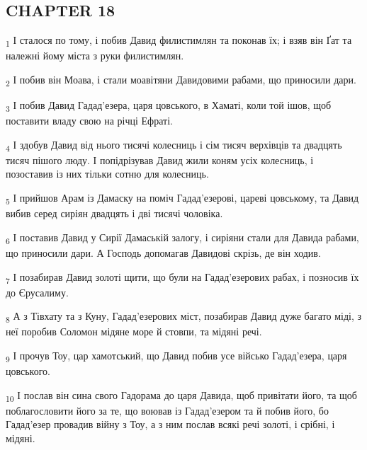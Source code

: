 \subsection{CHAPTER 18}
\begin{tcolorbox}
\textsubscript{1} І сталося по тому, і побив Давид филистимлян та поконав їх; і взяв він Ґат та належні йому міста з руки филистимлян.
\end{tcolorbox}
\begin{tcolorbox}
\textsubscript{2} І побив він Моава, і стали моавітяни Давидовими рабами, що приносили дари.
\end{tcolorbox}
\begin{tcolorbox}
\textsubscript{3} І побив Давид Гадад'езера, царя цовського, в Хаматі, коли той ішов, щоб поставити владу свою на річці Ефраті.
\end{tcolorbox}
\begin{tcolorbox}
\textsubscript{4} І здобув Давид від нього тисячі колесниць і сім тисяч верхівців та двадцять тисяч пішого люду. І попідрізував Давид жили коням усіх колесниць, і позоставив із них тільки сотню для колесниць.
\end{tcolorbox}
\begin{tcolorbox}
\textsubscript{5} І прийшов Арам із Дамаску на поміч Гадад'езерові, цареві цовському, та Давид вибив серед сиріян двадцять і дві тисячі чоловіка.
\end{tcolorbox}
\begin{tcolorbox}
\textsubscript{6} І поставив Давид у Сирії Дамаській залогу, і сиріяни стали для Давида рабами, що приносили дари. А Господь допомагав Давидові скрізь, де він ходив.
\end{tcolorbox}
\begin{tcolorbox}
\textsubscript{7} І позабирав Давид золоті щити, що були на Гадад'езерових рабах, і позносив їх до Єрусалиму.
\end{tcolorbox}
\begin{tcolorbox}
\textsubscript{8} А з Тівхату та з Куну, Гадад'езерових міст, позабирав Давид дуже багато міді, з неї поробив Соломон мідяне море й стовпи, та мідяні речі.
\end{tcolorbox}
\begin{tcolorbox}
\textsubscript{9} І прочув Тоу, цар хамотський, що Давид побив усе військо Гадад'езера, царя цовського.
\end{tcolorbox}
\begin{tcolorbox}
\textsubscript{10} І послав він сина свого Гадорама до царя Давида, щоб привітати його, та щоб поблагословити його за те, що воював із Гадад'езером та й побив його, бо Гадад'езер провадив війну з Тоу, а з ним послав всякі речі золоті, і срібні, і мідяні.
\end{tcolorbox}
